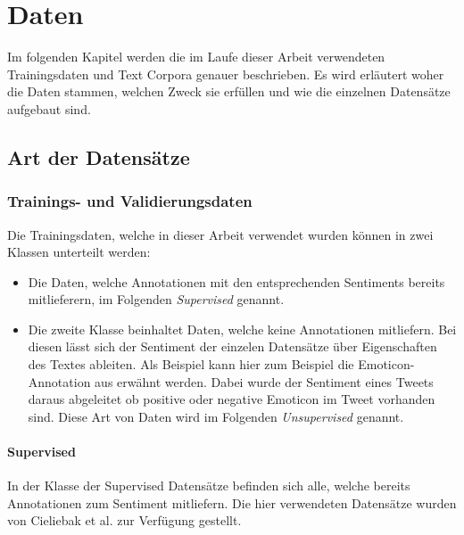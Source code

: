 \chapter{Daten}
Im  folgenden Kapitel werden die im Laufe dieser Arbeit verwendeten Trainingsdaten und Text Corpora genauer beschrieben. Es wird erläutert woher die Daten stammen, welchen Zweck sie erfüllen und wie die einzelnen Datensätze aufgebaut sind.

\section{Art der Datensätze}
\subsection{Trainings- und Validierungsdaten}
Die Trainingsdaten, welche in dieser Arbeit verwendet wurden können in zwei Klassen unterteilt werden:

\begin{itemize}
	\item Die Daten, welche Annotationen mit den entsprechenden Sentiments bereits mitlieferern, im Folgenden \emph{Supervised} genannt.
	\item Die zweite Klasse beinhaltet Daten, welche keine Annotationen mitliefern. Bei diesen lässt sich der Sentiment der einzelen Datensätze über Eigenschaften des Textes ableiten. Als Beispiel kann hier zum Beispiel die Emoticon-Annotation aus \cite{deriu2016sentiment} erwähnt werden. Dabei wurde der Sentiment eines Tweets daraus abgeleitet ob positive oder negative Emoticon im Tweet vorhanden sind. Diese Art von Daten wird im Folgenden \emph{Unsupervised} genannt.
\end{itemize}

\clearpage

\subsubsection{Supervised}
In der Klasse der Supervised Datensätze befinden sich alle, welche bereits Annotationen zum Sentiment mitliefern. Die hier verwendeten Datensätze wurden von Cieliebak et al. \cite{cieliebak2013potential} zur Verfügung gestellt.\\

